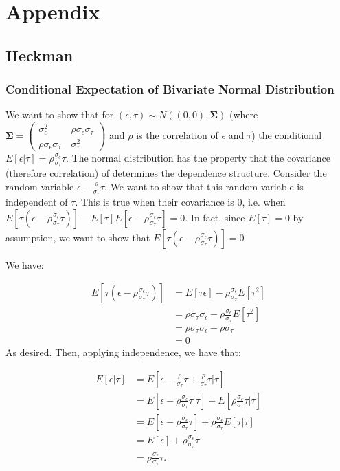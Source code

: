 \documentclass[12pt,twoside]{reedthesis}
\theoremstyle{definition}
\begin{document}
\chapter{Appendix}

\section{Heckman}
\subsection{Conditional Expectation of Bivariate Normal Distribution}

We want to show that for $(\epsilon, \tau) \sim N((0,0), \boldsymbol{\Sigma})$ (where $\boldsymbol{\Sigma} = \begin{pmatrix}
\sigma_\epsilon^2 &\ \rho \sigma_\epsilon \sigma_\tau \\
\rho \sigma_\epsilon \sigma_\tau &\ \sigma_\tau^2
\end{pmatrix}$ and $\rho$ is the correlation of $\epsilon$ and $\tau$) the conditional $E[\epsilon | \tau] = \rho \frac{\sigma_\epsilon}{\sigma_\tau} \tau$. The normal distribution has the property that the covariance (therefore correlation) of determines the dependence structure. Consider the random variable $\epsilon - \frac{\rho}{\sigma_\tau} \tau$. We want to show that this random variable is independent of $\tau$. This is true when their covariance is $0$, i.e. when $E[\tau (\epsilon -\rho \frac{\sigma_\epsilon}{\sigma_\tau}\tau)] - E[\tau] E[\epsilon - \rho \frac{\sigma_\epsilon}{\sigma_\tau}  \tau] = 0$. In fact, since $E[\tau]=0$ by assumption, we want to show that $E[\tau (\epsilon -\rho \frac{\sigma_\epsilon}{\sigma_\tau} \tau)] = 0$

We have:

\begin{align*}
E[\tau (\epsilon - \rho \frac{\sigma_\epsilon}{\sigma_\tau} \tau)] &= E[\tau \epsilon] -  \rho \frac{\sigma_\epsilon}{\sigma_\tau} E[\tau^2] \\
&=  \rho \sigma_\tau \sigma_\epsilon -  \rho \frac{\sigma_\epsilon}{\sigma_\tau}E[\tau^2] \\ 
&= \rho \sigma_\tau \sigma_\epsilon -  \rho \sigma_\tau \\
&= 0
\end{align*}
As desired. Then, applying independence, we have that:

\begin{align*}
E[\epsilon | \tau] &= E[\epsilon - \frac{\rho}{\sigma_\tau} \tau +  \frac{\rho}{\sigma_\tau} \tau | \tau] \\
&= E[\epsilon - \rho \frac{\sigma_\epsilon}{\sigma_\tau} \tau | \tau] + E[\rho \frac{\sigma_\epsilon}{\sigma_\tau} \tau | \tau] \\
&= E[\epsilon - \rho \frac{\sigma_\epsilon}{\sigma_\tau} \tau] +\rho \frac{\sigma_\epsilon}{\sigma_\tau}E[\tau | \tau] \\
&= E[\epsilon] + \rho \frac{\sigma_\epsilon}{\sigma_\tau} \tau \\
&= \rho \frac{\sigma_\epsilon}{\sigma_\tau} \tau. 
\end{align*}
\end{document}
